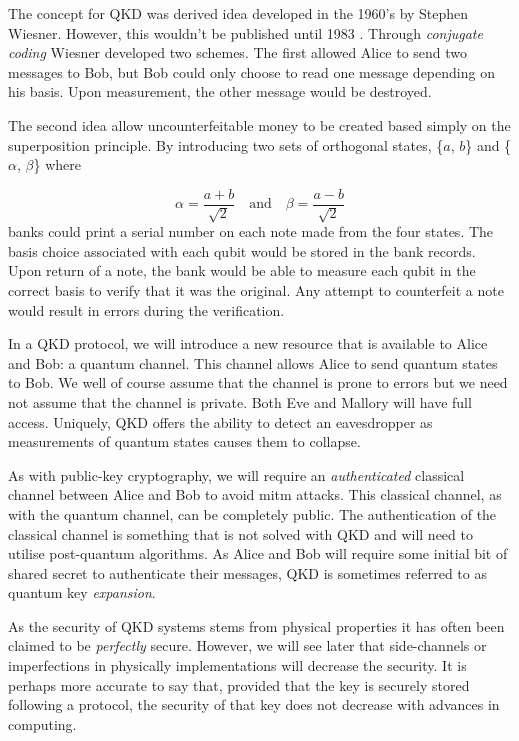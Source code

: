 The concept for \ac{QKD} was derived idea developed in the 1960's by Stephen Wiesner. However, this wouldn't be published until 1983 \cite{quantum_money}. Through \emph{conjugate coding} Wiesner developed two schemes. The first allowed Alice to send two messages to Bob, but Bob could only choose to read one message depending on his basis. Upon measurement, the other message would be destroyed.

The second idea allow uncounterfeitable money to be created based simply on the superposition principle. By introducing two sets of orthogonal states, \{$a$, $b$\} and \{$\alpha$, $\beta$\} where

\begin{equation}
	\alpha = \frac{a+b}{\sqrt{2}} \quad \text{and} \quad \beta = \frac{a-b}{\sqrt{2}}
\end{equation}
banks could print a serial number on each note made from the four states. The basis choice associated with each qubit would be stored in the bank records. Upon return of a note, the bank would be able to measure each qubit in the correct basis to verify that it was the original. Any attempt to counterfeit a note would result in errors during the verification. 


In a \ac{QKD} protocol, we will introduce a new resource that is available to Alice and Bob:  a quantum channel. This channel allows Alice to send quantum states to Bob. We well of course assume that the channel is prone to errors but we need not assume that the channel is private. Both Eve and Mallory will have full access. Uniquely, \ac{QKD} offers the ability to detect an eavesdropper as measurements of quantum states causes them to collapse.

As with public-key cryptography, we will require an \emph{authenticated} classical channel between Alice and Bob to avoid \ac{mitm} attacks. This classical channel, as with the quantum channel, can be completely public. The authentication of the classical channel is something that is not solved with \ac{QKD} and will need to utilise post-quantum algorithms. As Alice and Bob will require some initial bit of shared secret to authenticate their messages, \ac{QKD} is sometimes referred to as quantum key \emph{expansion}. 

As the security of \ac{QKD} systems stems from physical properties it has often been claimed to be \emph{perfectly} secure. However, we will see later that side-channels or imperfections in physically implementations will decrease the security. It is perhaps more accurate to say that, provided that the key is securely stored following a protocol, the security of that key does not decrease with advances in computing. 

